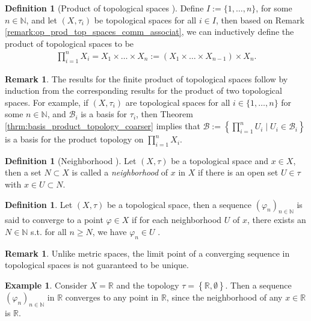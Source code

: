 \documentclass[12pt, a4paper]{article}
\numberwithin{equation}{section}
\theoremstyle{definition}
\theoremstyle{definition}
\newtheorem{defn}[thm]{Definition} %
\newtheorem{exmp}[thm]{Example} %
\newtheorem{remark}[thm]{Remark} %
\newcommand{\seq}[1][\varphi]{\left( #1 \right)_{n \in \mathbb{N}}}
\begin{document}
		\begin{defn}[Product of topological spaces \cite{topology-singh}]
			Define $I := \{1, \dots, n\}$, for some $n\in\mathbb N$, and let $(X, \tau_i)$ be topological spaces for all $i\in I$, then based on Remark \ref{remark:op_prod_top_spaces_comm_associat}, we can inductively define the product of topological spaces to be 
			\begin{align}
				\prod_{i=1}^{n}X_i = X_1 \times \dots\times X_n := (X_1\times \dots\times X_{n-1})\times X_n.
			\end{align}
		\end{defn}
	
		\begin{remark}
			The results for the finite product of topological spaces follow by induction from the corresponding results for the product of two topological spaces. For example, if $(X, \tau_i)$ are topological spaces for all $i\in \{1, \dots, n\}$ for some $n\in\mathbb N$, and $\mathscr B_i$ is a basis for $\tau_i$, then Theorem \ref{thrm:basis_product_topology_coarser} implies that $\mathscr B := \left\{\prod_{i=1}^{n}U_i\mid U_i\in \mathscr B_i\right\}$ is a basis for the product topology on $\prod_{i=1}^{n}X_i$.
		\end{remark}
		
		\begin{defn}[Neighborhood \cite{topology-singh}]
			Let $(X, \tau)$ be a topological space and $x\in X$, then a set $N\subset X$ is called a \textit{neighborhood} of $x$ in $X$ if there is an open set $U\in\tau$ with $x\in U\subset N$.
		\end{defn}
		
		\begin{defn}
			Let $(X, \tau)$ be a topological space, then a sequence $\seq[\varphi_n]$ is said to converge to a point $\varphi\in X$ if for each neighborhood $U$ of $x$, there exists an $N\in\mathbb N$ s.t. for all $n\geq N$, we have $\varphi_n\in U$ \cite{289740}.
		\end{defn}
		
		\begin{remark}
			Unlike metric spaces, the limit point of a converging sequence in topological spaces is not guaranteed to be unique.
		\end{remark}
		
		\begin{exmp}
			Consider $X = \mathbb R$ and the topology $\tau = \left\{\mathbb R, \emptyset\right\}$. Then a sequence $\seq[\varphi_n]$ in $\mathbb R$ converges to any point in $\mathbb R$, since the neighborhood of any $x\in \mathbb R$ is $\mathbb R$.
		\end{exmp}
		
\end{document}
